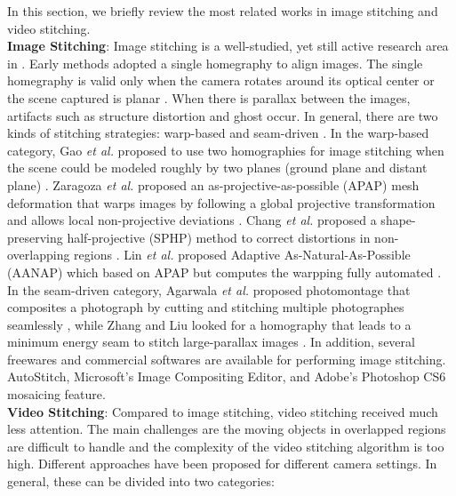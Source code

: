 \documentclass[conference]{IEEEtran}
\begin{document}
In this section, we briefly review the most related works in image stitching and video stitching.\\
{\bf Image Stitching}: Image stitching is a well-studied, yet still active research 
area in \cite{paragios2006handbook, brown2007automatic,hartley2003multiple,lin2011smoothly, chang2014shape, zaragoza2013projective,lin2015adaptive,zhang2014parallax, gao2013seam, agarwala2004interactive,gao2011constructing}. 
Early methods adopted a single homegraphy to align images. The single homegraphy 
is valid only when the camera rotates around its optical center or the scene captured 
is planar \cite{hartley2003multiple}. When there is parallax between the images, 
artifacts such as structure distortion and 
ghost occur. In general, there are two kinds of stitching strategies: 
warp-based \cite{lin2011smoothly, chang2014shape, zaragoza2013projective} and 
seam-driven \cite{zhang2014parallax, gao2013seam, agarwala2004interactive}. In the warp-based category, 
Gao \textit{et al.} proposed to use two homographies for image stitching 
when the scene could be modeled roughly by two planes (ground plane and distant plane) \cite{gao2011constructing}.
Zaragoza \textit{et al.} proposed an as-projective-as-possible (APAP) mesh deformation that warps
images by following a global projective transformation and allows local non-projective 
deviations \cite{zaragoza2013projective}.
Chang \textit{et al.} proposed a shape-preserving half-projective (SPHP) method
to correct distortions in non-overlapping regions \cite{chang2014shape}. 
Lin \textit{et al.} proposed Adaptive As-Natural-As-Possible (AANAP) 
which based on APAP but computes the warpping fully automated \cite{lin2015adaptive}.
In the seam-driven category, Agarwala \textit{et al.}
proposed photomontage that composites a photograph by
cutting and stitching multiple photographes seamlessly \cite{agarwala2004interactive},
while Zhang and Liu looked for a homography that leads to a
minimum energy seam to stitch large-parallax images \cite{zhang2014parallax}.
In addition, several freewares and commercial softwares are available for performing image stitching.
AutoStitch, Microsoft’s Image Compositing Editor, and Adobe's Photoshop CS6 mosaicing feature.\\
{\bf Video Stitching}: Compared to image stitching, video stitching received much less attention. 
The main challenges are the moving objects in overlapped regions are difficult to handle and the complexity of the video stitching algorithm is too high.
Different approaches have been proposed for different camera settings. In general, these can be divided into two categories: 
\end{document}
